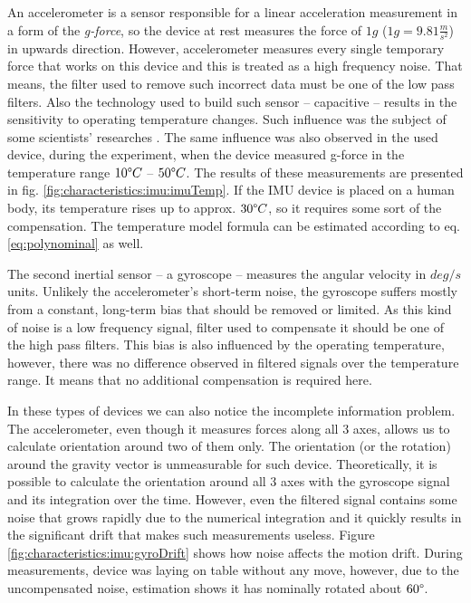 \documentclass{llncs}
\begin{document}
An accelerometer is a sensor responsible for a linear acceleration measurement in a form of the \textit{g-force}, so the device at  rest measures the force of $1g$ ($1g = 9.81\frac{m}{s^2}$) in upwards direction. However, accelerometer measures every single temporary force that works on this device and this is treated as a high frequency noise. That means, the filter used to remove such incorrect data must be one of the low pass filters. Also the technology used to build such sensor -- capacitive -- results in the sensitivity to operating temperature changes. Such influence was the subject of some scientists' researches \cite{Gebhardt2006,Grigorie1996}. The same influence was also observed in the used device, during the experiment, when the device measured g-force in the temperature range $10\degree C$ -- $50\degree C$. The results of  these measurements are presented in fig. \ref{fig:characteristics:imu:imuTemp}. If the IMU device is placed on a human body, its temperature rises up to approx. $30\degree C$, so it requires some sort of the compensation. The temperature model formula can be estimated according to eq. \eqref{eq:polynominal} as well.

The second inertial sensor -- a gyroscope -- measures the angular velocity in $deg/s$ units. Unlikely the accelerometer's short-term noise, the gyroscope suffers mostly from a constant, long-term bias that should be removed or limited. As this kind of noise is a low frequency signal, filter used to compensate it should be one of the high pass filters. This bias is also influenced by the operating temperature, however, there was no difference observed in filtered signals over the temperature range. It means that no additional compensation is required here.
 
In these types of devices we can also notice the incomplete information problem. The accelerometer, even though it measures forces along all 3 axes, allows us to calculate orientation around two of them only. The orientation (or the rotation) around the gravity vector is unmeasurable for such device. Theoretically, it is possible to calculate the orientation around all 3 axes with the gyroscope signal and its integration over the time. However, even the filtered signal contains some noise that grows rapidly due to the numerical integration and it quickly results in the significant drift that makes such measurements useless. Figure \ref{fig:characteristics:imu:gyroDrift} shows how noise affects the motion drift. During measurements, device was laying on table without any move, however, due to the uncompensated noise, estimation shows it has nominally rotated about $60\degree$.
\end{document}
